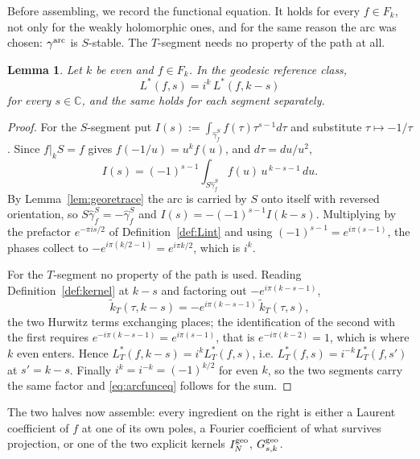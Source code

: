 \documentclass[11pt]{article}
\newtheorem{lemma}[theorem]{Lemma}
\newcommand{\CC}{\mathbb{C}}
\newcommand{\tk}{\widetilde{k}_T}
\begin{document}
Before assembling, we record the functional equation. It holds for every $f\in F_k$, not only
for the weakly holomorphic ones, and for the same reason the arc was chosen: $\gamma^{\rm arc}$
is $S$-stable. The $T$-segment needs no property of the path at all.

\begin{lemma}\label{lem:arcfunceq}
Let $k$ be even and $f\in F_k$. In the geodesic reference class,
\begin{equation}\label{eq:arcfunceq}
L^*(f,s)=i^{k}\,L^*(f,k-s)
\end{equation}
for every $s\in\CC$, and the same holds for each segment separately.
\end{lemma}

\begin{proof}
For the $S$-segment put $I(s):=\int_{\hat\gamma^S_f}f(\tau)\tau^{s-1}d\tau$ and substitute
$\tau\mapsto-1/\tau$. Since $f|_kS=f$ gives $f(-1/u)=u^{k}f(u)$, and $d\tau=du/u^{2}$,
$$I(s)=(-1)^{s-1}\int_{S\hat\gamma^S_f}f(u)\,u^{\,k-s-1}\,du .$$
By Lemma~\ref{lem:georetrace} the arc is carried by $S$ onto itself with reversed orientation,
so $S\hat\gamma^S_f=-\hat\gamma^S_f$ and $I(s)=-(-1)^{s-1}I(k-s)$. Multiplying by the prefactor
$e^{-\pi is/2}$ of Definition~\ref{def:Lint} and using $(-1)^{s-1}=e^{i\pi(s-1)}$, the phases
collect to $-e^{i\pi(k/2-1)}=e^{i\pi k/2}$, which is $i^{k}$.

For the $T$-segment no property of the path is used. Reading Definition~\ref{def:kernel} at
$k-s$ and factoring out $-e^{i\pi(k-s-1)}$,
\begin{equation}\label{eq:ktilflip}
\tk(\tau,k-s)=-e^{i\pi(k-s-1)}\,\tk(\tau,s),
\end{equation}
the two Hurwitz terms exchanging places; the identification of the second with the first
requires $e^{-i\pi(k-s-1)}=e^{i\pi(s-1)}$, that is $e^{-i\pi(k-2)}=1$, which is where $k$ even
enters. Hence $L^*_T(f,k-s)=i^{k}L^*_T(f,s)$, i.e. $L^*_T(f,s)=i^{-k}L^*_T(f,s')$ at $s'=k-s$.
Finally $i^{k}=i^{-k}=(-1)^{k/2}$ for even $k$, so the two segments carry the same factor and
\eqref{eq:arcfunceq} follows for the sum.
\end{proof}

The two halves now assemble: every ingredient on the right is either a Laurent coefficient of $f$
at one of its own poles, a Fourier coefficient of what survives projection, or one of the two
explicit kernels $I^{\rm geo}_N$, $G^{\rm geo}_{s,k}$.
\end{document}
